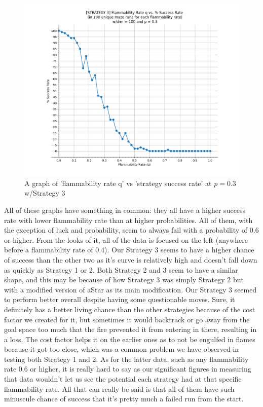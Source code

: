 \documentclass[11pt]{article}
\begin{document}
\begin{figure}[!]
\centering
\includegraphics[scale=0.50]{Strategy3_q_successRate.PNG}
\caption{A graph of 'flammability rate q' vs 'strategy success rate' at $p = 0.3$ w/Strategy 3}
\end{figure}

All of these graphs have something in common: they all have a higher success rate with lower flammability rate than at higher probabilities. All of them, with the exception of luck and probability, seem to always fail with a probability of 0.6 or higher. From the looks of it, all of the data is focused on the left (anywhere before a flammability rate of 0.4). Our Strategy 3 seems to have a higher chance of success than the other two as it's curve is relatively high and doesn't fall down as quickly as Strategy 1 or 2. Both Strategy 2 and 3 seem to have a similar shape, and this may be because of how Strategy 3 was simply Strategy 2 but with a modified version of aStar as its main modification. Our Strategy 3 seemed to perform better overall despite having some questionable moves. Sure, it definitely has a better living chance than the other strategies because of the cost factor we created for it, but sometimes it would backtrack or go away from the goal space too much that the fire prevented it from entering in there, resulting in a loss. The cost factor helps it on the earlier ones as to not be engulfed in flames because it got too close, which was a common problem we have observed in testing both Strategy 1 and 2. As for the latter data, such as any flammability rate 0.6 or higher, it is really hard to say as our significant figures in measuring that data wouldn't let us see the potential each strategy had at that specific flammability rate. All that can really be said is that all of them have such minuscule chance of success that it's pretty much a failed run from the start. 
\pagebreak
\end{document}
